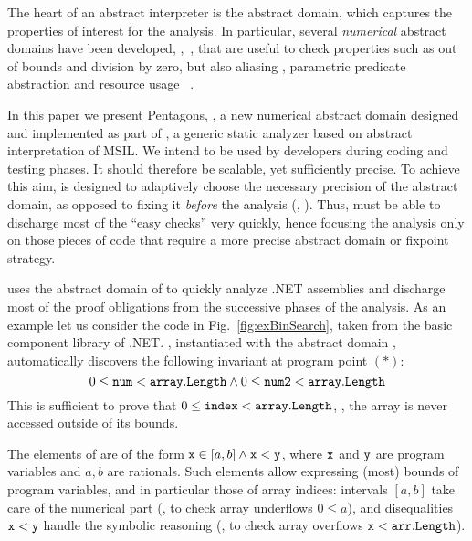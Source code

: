 \documentclass{sig-alternate}
\begin{document}
The heart of an abstract interpreter is the abstract domain, which captures the properties of interest for the analysis.
In particular,  several \emph{numerical} abstract domains have been
developed, \eg,~\cite{CousotHalbwachs78,Mine01-2,SimonKing02}, that
are useful to check properties such as out of bounds and division by zero, but also aliasing \cite{Venet02}, parametric predicate abstraction \cite{Cousot03} and resource usage ~\cite{Navas07}.

In this paper we present  Pentagons, \Pentagons, a new numerical
abstract domain designed and implemented as part of \Clousot{}, a generic static analyzer based on abstract interpretation of MSIL.
We intend \Clousot{} to be used by developers during coding and
testing phases. It should therefore be scalable, yet sufficiently precise.
To achieve this aim, \Clousot{} is designed to adaptively choose the
necessary precision of the abstract domain, as opposed to fixing it
\emph{before} the analysis (\eg, \cite{Logozzo07}).
Thus, \Clousot{} must be able to discharge most of the ``easy checks''
very quickly, hence focusing the analysis only on those pieces of code
that require a more precise abstract domain or fixpoint strategy.

\Clousot{} uses the abstract domain of \Pentagons{} to quickly analyze .NET assemblies and discharge most of the proof obligations from the successive phases of the analysis.
As an example let us consider the code in Fig.~\ref{fig:exBinSearch}, taken from the basic component library of .NET.
\Clousot{}, instantiated with the abstract domain \Pentagons,
automatically discovers  the following invariant at program point $\mathtt{(*)}$:
\[ 
0 \leq \mathtt{num} < \mathtt{array.Length} \wedge 0 \leq \mathtt{num2} < \mathtt{array.Length}
\]
This is sufficient to prove that $0 \leq \mathtt{index} < \mathtt{array.Length}$, \ie, the array is never accessed outside of its bounds.

The elements of \Pentagons{} are of the form $\mathtt{x} \in [a, b]\wedge \mathtt{x} < \mathtt{y}$, where $\mathtt{x}$ and $\mathtt{y}$ are program variables and $a, b$ are rationals.
Such elements allow expressing (most)  bounds of program variables,
and in particular those of array indices: intervals $[a,b]$ take care of the numerical part (\eg, to check array  underflows $0 \leq a$), and disequalities $\mathtt{x} < \mathtt{y}$ handle the symbolic reasoning (\eg, to check array overflows $\mathtt{x} < \mathtt{arr.Length}$).
\end{document}
